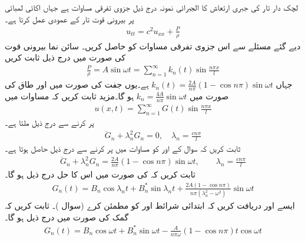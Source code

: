 \quad لچک دار تار کی جبری ارتعاش کا الجبرائی نمونہ درج ذیل جزوی تفرقی مساوات  ہے جہاں اکائی لمبائی پر  بیرونی قوت   تار کے عمودی عمل کرتا ہے۔
\begin{align}\label{مساوات_جزوی_تار_جبری_الف}
u_{tt}=c^2u_{xx}+\frac{P}{\rho}
\end{align} 
دیے گئے مسئلے سے اس جزوی تفرقی مساوات کو حاصل کریں۔
\quad
سائن نما بیرونی قوت  کی صورت میں درج ذیل ثابت کریں
\begin{align*}
\frac{P}{\rho}=A\sin \omega t=\sum_{n=1}^{\infty} k_n(t)\sin \frac{n\pi x}{l}
\end{align*}
جہاں 
$k_n(t)=\tfrac{2A}{n\pi}(1-\cos n\pi)\sin \omega t$
 ہے۔یوں جفت  کی صورت میں  اور طاق  کی صورت میں 
$k_n=\tfrac{4A}{n\pi}\sin \omega t$
ہو گا۔مزید ثابت کریں کہ مساوات  میں
\begin{align*}
u(x,t)=\sum_{n=1}^{\infty} G(t)\sin \frac{n\pi x}{l}
\end{align*}
پر کرنے سے درج ذیل ملتا ہے۔
\begin{align*}
\ddot{G}_n+\lambda^2_n G_n=0,\quad \lambda_n=\frac{cn\pi}{l}
\end{align*}
\quad
ثابت کریں کہ  سوال  کے  اور  کو مساوات  میں پر کرنے سے درج ذیل حاصل ہوتا ہے۔
\begin{align*}
\ddot{G}_n+\lambda^2_nG_n=\frac{2A}{n\pi}(1-\cos n\pi)\sin\omega t,\quad \quad \lambda_n=\frac{cn\pi}{l}
\end{align*}  
ثابت کریں کہ  کی صورت میں اس کا حل درج ذیل ہو گا۔
\begin{align*}
G_n(t)=B_n\cos\lambda_nt+B^*_n\sin\lambda_nt+\frac{2A(1-\cos n\pi)}{n\pi(\lambda^2_n-\omega^2)}\sin \omega t
\end{align*}
\quad
ایسے  اور  دریافت کریں کہ  ابتدائی شرائط  اور  کو مطمئن کرے (سوال )۔
\quad
ثابت کریں کہ گمک  کی صورت میں درج ذیل ہو گا۔
\begin{align*}
G_n(t)=B_n\cos \omega t+B^*_n\sin\omega t-\frac{A}{n\pi \omega}(1-\cos n\pi)t\cos \omega t
\end{align*}

